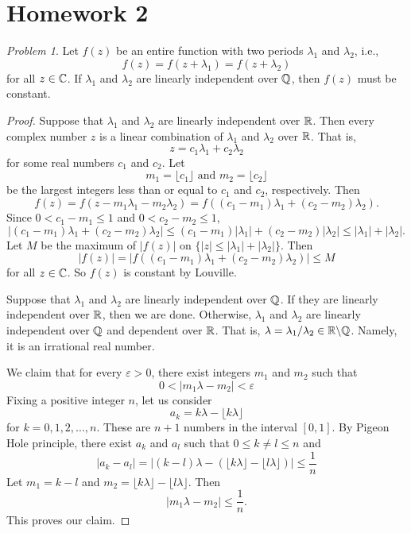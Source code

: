 \documentclass[11pt]{amsart}
\theoremstyle{remark}
\newtheorem{prob}{Problem}[section]
\theoremstyle{definition}
\numberwithin{equation}{section}
\begin{document}
\section{Homework 2}

\begin{prob}
    Let $f(z)$ be an entire function with two periods $\lambda_1$ and $\lambda_2$, i.e.,
    \[
        f(z) = f(z+\lambda_1) = f(z+\lambda_2)
    \]
    for all $z\in {\mathbb C}$. If $\lambda_1$ and $\lambda_2$ are linearly independent over ${\mathbb Q}$, then $f(z)$ must be constant.
\end{prob}

\begin{proof}
    Suppose that $\lambda_1$ and $\lambda_2$ are linearly independent over ${\mathbb R}$. Then every complex number $z$ is a linear combination of $\lambda_1$ and $\lambda_2$ over ${\mathbb R}$. That is,
    \[
        z = c_1 \lambda_1 + c_2\lambda_2
    \]
    for some real numbers $c_1$ and $c_2$. Let
    \[
        m_1 = \lfloor c_1\rfloor \text{ and } m_2 = \lfloor c_2\rfloor
    \]
    be the largest integers less than or equal to $c_1$ and $c_2$, respectively. Then
    \[
        f(z) = f(z - m_1 \lambda_1 - m_2\lambda_2)
        = f((c_1-m_1) \lambda_1 + (c_2 - m_2)\lambda_2).
    \]
    Since $0 < c_1 - m_1 \le 1$ and $0 < c_2 - m_2 \le 1$,
    \[
        |(c_1-m_1) \lambda_1 + (c_2 - m_2)\lambda_2|
        \le (c_1 - m_1) |\lambda_1| + (c_2 - m_2)|\lambda_2|
        \le |\lambda_1| + |\lambda_2|.
    \]
    Let $M$ be the maximum of $|f(z)|$ on $\{|z|\le |\lambda_1| + |\lambda_2|\}$. Then
    \[
        |f(z)|
        = |f((c_1-m_1) \lambda_1 + (c_2 - m_2)\lambda_2)| \le M
    \]
    for all $z\in {\mathbb C}$. So $f(z)$ is constant by Louville.

    Suppose that $\lambda_1$ and $\lambda_2$ are linearly independent over ${\mathbb Q}$. If they are linearly independent over ${\mathbb R}$, then we are done. Otherwise, $\lambda_1$ and $\lambda_2$ are linearly independent over ${\mathbb Q}$ and dependent over ${\mathbb R}$. That is, $\lambda = \lambda_1/\lambda_2\in {\mathbb R}\backslash {\mathbb Q}$. Namely, it is an irrational real number.

    We claim that for every $\varepsilon > 0$, there exist integers $m_1$ and $m_2$ such that
    \[
        0 < |m_1\lambda - m_2| < \varepsilon
    \]
    Fixing a positive integer $n$, let us consider
    \[
        a_k = k \lambda - \lfloor k\lambda \rfloor
    \]
    for $k=0,1,2,...,n$. These are $n+1$ numbers in the interval $[0,1]$. By Pigeon Hole principle, there exist $a_k$ and $a_l$ such that $0\le k\ne l\le n$ and
    \[
        |a_k - a_l| = |(k-l) \lambda -(\lfloor k\lambda \rfloor
        - \lfloor l\lambda \rfloor)| \le \frac{1}n
    \]
    Let $m_1 = k-l$ and $m_2 = \lfloor k\lambda \rfloor
        - \lfloor l\lambda \rfloor$. Then
    \[
        |m_1 \lambda - m_2| \le \frac{1}n.
    \]
    This proves our claim.


\end{proof}
\end{document}
